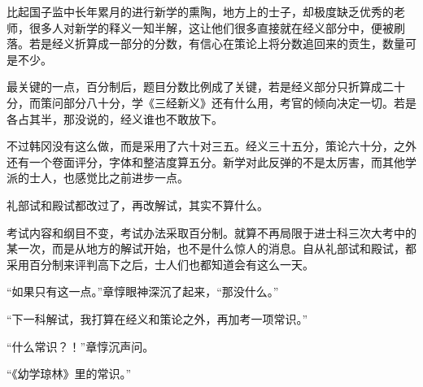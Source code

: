 比起国子监中长年累月的进行新学的熏陶，地方上的士子，却极度缺乏优秀的老师，很多人对新学的释义一知半解，这让他们很多直接就在经义部分中，便被刷落。若是经义折算成一部分的分数，有信心在策论上将分数追回来的贡生，数量可是不少。

最关键的一点，百分制后，题目分数比例成了关键，若是经义部分只折算成二十分，而策问部分八十分，学《三经新义》还有什么用，考官的倾向决定一切。若是各占其半，那没说的，经义谁也不敢放下。

不过韩冈没有这么做，而是采用了六十对三五。经义三十五分，策论六十分，之外还有一个卷面评分，字体和整洁度算五分。新学对此反弹的不是太厉害，而其他学派的士人，也感觉比之前进步一点。

礼部试和殿试都改过了，再改解试，其实不算什么。

考试内容和纲目不变，考试办法采取百分制。就算不再局限于进士科三次大考中的某一次，而是从地方的解试开始，也不是什么惊人的消息。自从礼部试和殿试，都采用百分制来评判高下之后，士人们也都知道会有这么一天。

“如果只有这一点。”章惇眼神深沉了起来，“那没什么。”

“下一科解试，我打算在经义和策论之外，再加考一项常识。”

“什么常识？！”章惇沉声问。

“《幼学琼林》里的常识。”

